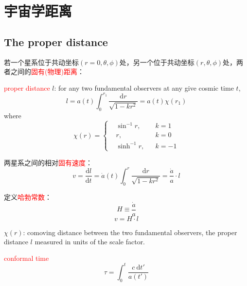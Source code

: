 \documentclass[12pt,a4paper]{article}
\newcommand{\dif}{\mathrm{d}}
\begin{document}
\section{宇宙学距离}
\subsection{The proper distance}
若一个星系位于共动坐标$(r = 0, \theta, \phi)$处，另一个位于共动坐标$(r, \theta, \phi)$处，两者之间的\textcolor{red}{固有(物理)距离}：

\textcolor{red}{proper distance} $l$: for any two fundamental observers at any give cosmic time $t$,
\begin{equation}
l = a(t) \int_0^{r_1} \frac{\dif r}{\sqrt{1- kr^2}} = a(t)\chi(r_1)
\end{equation}
where
\begin{equation}
\chi(r) = \left\{
\begin{aligned}
& \sin^{-1} r,   && k = 1 \\
& r,                 && k = 0 \\
& \sinh^{-1} r, && k = -1
\end{aligned}
\right.
\end{equation}

两星系之间的相对\textcolor{red}{固有速度}：
\begin{equation}
v = \frac{\dif l}{\dif t} = \dot{a}(t) \int_0^{r} \frac{\dif r}{\sqrt{1-kr^2}} = \frac{\dot{a}}{a} \cdot l
\end{equation}

定义\textcolor{red}{哈勃常数}：
\begin{equation}
H \equiv \frac{\dot{a}}{a}
\end{equation}
\begin{equation}
v = H\cdot l
\end{equation}

$\chi(r)$: comoving distance between the two fundamental observers, the proper distance $l$ measured in units of the scale factor.

\textcolor{red}{conformal time}
\begin{equation}
\tau = \int_0^{t}  \frac{c~ \dif t'}{a(t')}
\end{equation}
\end{document}
